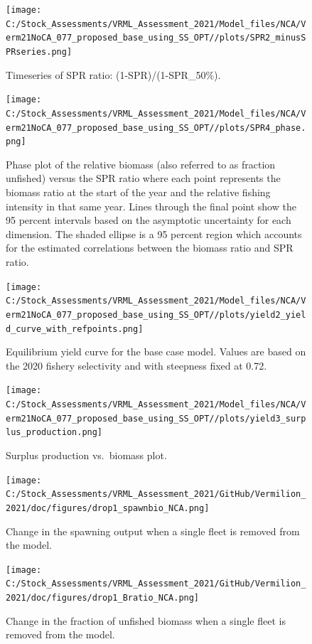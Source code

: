 \documentclass[
  english,
  a4paper,
]{article}
\begin{document}
\begin{figure}
\centering
\texttt{[image: C:/Stock\_Assessments/VRML\_Assessment\_2021/Model\_files/NCA/Verm21NoCA\_077\_proposed\_base\_using\_SS\_OPT//plots/SPR2\_minusSPRseries.png]}
\caption{Timeseries of SPR ratio: (1-SPR)/(1-SPR\_50\%).\label{fig:1-spr}}
\end{figure}

\begin{figure}
\centering
\texttt{[image: C:/Stock\_Assessments/VRML\_Assessment\_2021/Model\_files/NCA/Verm21NoCA\_077\_proposed\_base\_using\_SS\_OPT//plots/SPR4\_phase.png]}
\caption{Phase plot of the relative biomass (also referred to as fraction unfished) versus the SPR ratio where each point represents the biomass ratio at the start of the year and the relative fishing intensity in that same year. Lines through the final point show the 95 percent intervals based on the asymptotic uncertainty for each dimension. The shaded ellipse is a 95 percent region which accounts for the estimated correlations between the biomass ratio and SPR ratio.\label{fig:phase}}
\end{figure}

\begin{figure}
\centering
\texttt{[image: C:/Stock\_Assessments/VRML\_Assessment\_2021/Model\_files/NCA/Verm21NoCA\_077\_proposed\_base\_using\_SS\_OPT//plots/yield2\_yield\_curve\_with\_refpoints.png]}
\caption{Equilibrium yield curve for the base case model. Values are based on the 2020
fishery selectivity and with steepness fixed at 0.72.\label{fig:yield2}}
\end{figure}

\begin{figure}
\centering
\texttt{[image: C:/Stock\_Assessments/VRML\_Assessment\_2021/Model\_files/NCA/Verm21NoCA\_077\_proposed\_base\_using\_SS\_OPT//plots/yield3\_surplus\_production.png]}
\caption{Surplus production vs.~biomass plot.\label{fig:yield3}}
\end{figure}

\FloatBarrier

\begin{figure}
\centering
\texttt{[image: C:/Stock\_Assessments/VRML\_Assessment\_2021/GitHub/Vermilion\_2021/doc/figures/drop1\_spawnbio\_NCA.png]}
\caption{Change in the spawning output when a single fleet is removed from the model.\label{fig:drop-spawnbio}}
\end{figure}

\begin{figure}
\centering
\texttt{[image: C:/Stock\_Assessments/VRML\_Assessment\_2021/GitHub/Vermilion\_2021/doc/figures/drop1\_Bratio\_NCA.png]}
\caption{Change in the fraction of unfished biomass when a single fleet is removed from the model.\label{fig:drop-bratio}}
\end{figure}
\end{document}
